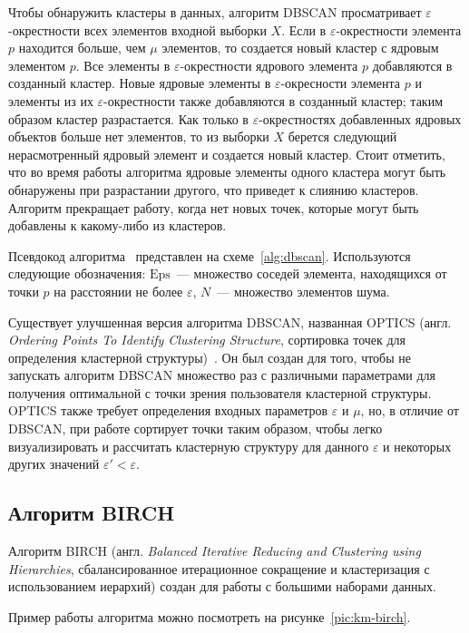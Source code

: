 Чтобы обнаружить кластеры в данных, алгоритм DBSCAN просматривает \( \varepsilon \)-окрестности всех элементов входной выборки \( X \). Если в \( \varepsilon \)-окрестности элемента \( p \) находится больше, чем \( \mu \) элементов, то создается новый кластер с ядровым элементом \( p \). Все элементы в \( \varepsilon \)-окрестности ядрового элемента \( p \) добавляются в созданный кластер. Новые ядровые элементы в \( \varepsilon \)-окресности элемента \( p \) и элементы из их \( \varepsilon \)-окрестности также добавляются в созданный кластер; таким образом кластер разрастается. Как только в \( \varepsilon \)-окрестностях добавленных ядровых объектов больше нет элементов, то из выборки \( X \) берется следующий нерасмотренный ядровый элемент и создается новый кластер. Стоит отметить, что во время работы алгоритма ядровые элементы одного кластера могут быть обнаружены при разрастании другого, что приведет к слиянию кластеров. Алгоритм прекращает работу, когда нет новых точек, которые могут быть добавлены к какому-либо из кластеров.

Псевдокод алгоритма~\cite[с. 199]{dbscan-pos} представлен на схеме~\ref{alg:dbscan}. Используются следующие обозначения: \( \mathrm{Eps} \)~--- множество соседей элемента, находящихся от точки \( p \) на расстоянии не более \( \varepsilon \), \( N \)~--- множество элементов шума.

Существует улучшенная версия алгоритма DBSCAN, названная OPTICS (англ. \emph{Ordering Points To Identify Clustering Structure}, сортировка точек для определения кластерной структуры)~\cite{cod}. Он был создан для того, чтобы не запускать алгоритм DBSCAN множество раз с различными параметрами для получения оптимальной с точки зрения пользователя кластерной структуры. OPTICS также требует определения входных параметров \( \varepsilon \) и \( \mu \), но, в отличие от DBSCAN, при работе сортирует точки таким образом, чтобы легко визуализировать и рассчитать кластерную структуру для данного \( \varepsilon \) и некоторых других значений \( \varepsilon' < \varepsilon \).

\subsection{Алгоритм BIRCH}
Алгоритм BIRCH (англ. \emph{Balanced Iterative Reducing and Clustering using Hierarchies}, сбалансированное итерационное сокращение и кластеризация с использованием иерархий) создан для работы с большими наборами данных.

Пример работы алгоритма можно посмотреть на рисунке~\ref{pic:km-birch}.

